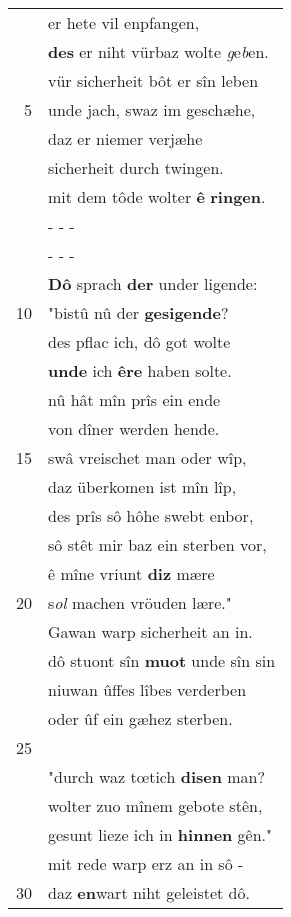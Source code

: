 \documentclass[8pt,a4paper,notitlepage]{article}
\begin{document}
\begin{table}[ht]
\begin{minipage}[t]{0.5\linewidth}
\begin{tabular}{rl}
 & er hete vil enpfangen,\\ 
 & \textbf{des} er niht vürbaz wolte \textit{g}e\textit{b}en.\\ 
 & vür sicherheit bôt er sîn leben\\ 
5 & unde jach, swaz im geschæhe,\\ 
 & daz er niemer verjæhe\\ 
 & sicherheit durch twingen.\\ 
 & mit dem tôde wolter \textbf{ê} \textbf{ringen}.\\ 
 & \multicolumn{1}{l}{ - - - }\\ 
 & \multicolumn{1}{l}{ - - - }\\ 
 & \textbf{Dô} sprach \textbf{der} under ligende:\\ 
10 & "bistû nû der \textbf{gesigende}?\\ 
 & des pflac ich, dô got wolte\\ 
 & \textbf{unde} ich \textbf{êre} haben solte.\\ 
 & nû hât mîn prîs ein ende\\ 
 & von dîner werden hende.\\ 
15 & swâ vreischet man oder wîp,\\ 
 & daz überkomen ist mîn lîp,\\ 
 & des prîs sô hôhe swebt enbor,\\ 
 & sô stêt mir baz ein sterben vor,\\ 
 & ê mîne vriunt \textbf{diz} mære\\ 
20 & s\textit{ol} machen vröuden lære."\\ 
 & Gawan warp sicherheit an in.\\ 
 & dô stuont sîn \textbf{muot} unde sîn sin\\ 
 & niuwan ûffes lîbes verderben\\ 
 & oder ûf ein gæhez sterben.\\ 
25 & \textit{\begin{large}D\end{large}}ô dâhte mîn hêr Gawan:\\ 
 & "durch waz tœtich \textbf{disen} man?\\ 
 & wolter zuo mînem gebote stên,\\ 
 & gesunt lieze ich in \textbf{hinnen} gên."\\ 
 & mit rede warp erz an in sô -\\ 
30 & daz \textbf{en}wart niht geleistet dô.\\ 
\end{tabular}

\end{minipage}
\end{table}
\end{document}
